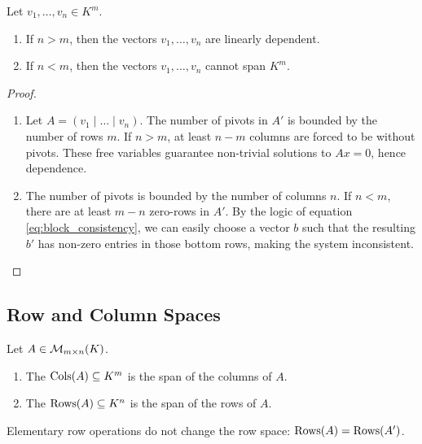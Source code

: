 \begin{theorem}
\label{thm:coordinate_constraints}
Let $v_{1}, \dots, v_{n} \in K^{m}$.
\begin{enumerate}
    \item If $n > m$, then the vectors $v_{1}, \dots, v_{n}$ are linearly dependent.
    \item If $n < m$, then the vectors $v_{1}, \dots, v_{n}$ cannot span $K^{m}$.
\end{enumerate}
\end{theorem}

\begin{proof}
\begin{enumerate}
    \item Let $A = (v_{1} \mid \dots \mid v_{n})$. The number of pivots in $A'$ is bounded by the number of rows $m$. If $n > m$, at least $n - m$ columns are forced to be without pivots. These free variables guarantee non-trivial solutions to $Ax = 0$, hence dependence.
    \item The number of pivots is bounded by the number of columns $n$. If $n < m$, there are at least $m - n$ zero-rows in $A'$. By the logic of equation \eqref{eq:block_consistency}, we can easily choose a vector $b$ such that the resulting $b'$ has non-zero entries in those bottom rows, making the system inconsistent.
\end{enumerate}
\end{proof}

\subsection{Row and Column Spaces}

\begin{definition}
\label{def:matrix_subspaces}
Let $A \in \mathcal{M}_{m \times n}(K)$.
\begin{enumerate}
\item The  $\operatorname{Cols}(A) \subseteq K^{m}$ is the span of the columns of $A$.
\item The  $\operatorname{Rows}(A) \subseteq K^{n}$ is the span of the rows of $A$.
\end{enumerate}
\end{definition}

\begin{proposition}
\label{prop:row_space_invariance}
Elementary row operations do not change the row space: $\operatorname{Rows}(A) = \operatorname{Rows}(A')$.
\end{proposition}

